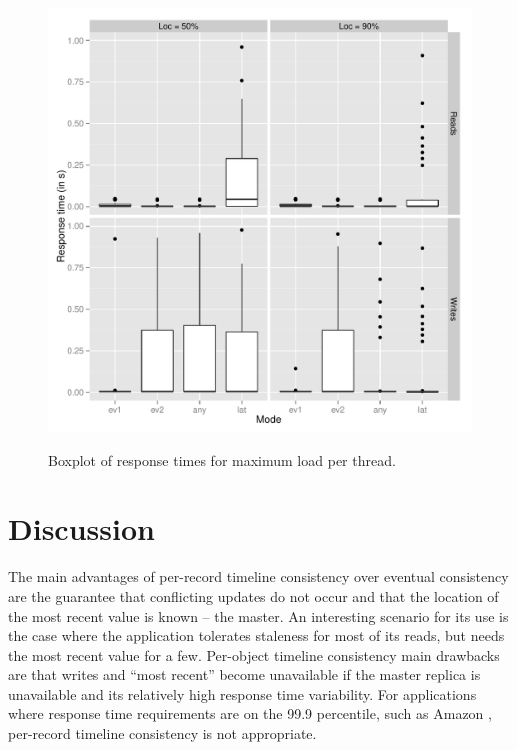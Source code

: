\documentclass[doublespacing]{bmcart}
\begin{document}
\begin{figure}[h!]
\caption{Boxplot of response times for maximum load per thread.}
\includegraphics[width=1.0\textwidth]{boxplot200_max.png}
\label{fig:boxplot_dos_tempos_de_resposta_para_carga_maxima}
\end{figure}

\section{Discussion}

The main advantages of per-record timeline consistency over eventual
consistency are the guarantee that conflicting updates do not occur and that
the location of the most recent value is known -- the master. An interesting
scenario for its use is the case where the application tolerates staleness for
most of its reads, but needs the most recent value for a few. Per-object
timeline consistency main drawbacks are that writes and ``most recent'' become
unavailable if the master replica is unavailable and its relatively high
response time variability. For applications where response time requirements
are on the 99.9 percentile, such as Amazon \cite{DeCandia2007}, per-record
timeline consistency is not appropriate.
\end{document}
